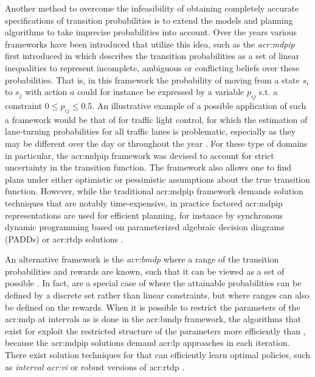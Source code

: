 Another method to overcome the infeasibility of obtaining completely accurate specifications of transition probabilities is to extend the models and planning algorithms to take imprecise probabilities into account.
Over the years various frameworks have been introduced that utilize this idea, such as the \textit{\acrfull{acr:mdpip}} first introduced in \cite{satia1973markovian} which describes the transition probabilities as a set of linear inequalities to represent incomplete, ambiguous or conflicting beliefs over these probabilities.
That is, in this framework the probability of moving from a state $s_i$ to $s_j$ with action $a$ could for instance be expressed by a variable $p_{ij}$ s.t. a constraint $0 \leq p_{ij} \leq 0.5$.
An illustrative example of a possible application of such a framework would be that of  for traffic light control, for which the estimation of lane-turning probabilities for all traffic lanes is problematic, especially as they may be different over the day or throughout the year \cite{delgado2011efficient}.
For these type of domains in particular, the \acrshort{acr:mdpip} framework was devised to account for strict uncertainty in the transition function.
The framework also allows one to find plans under either optimistic or pessimistic assumptions about the true transition function.
However, while the traditional \acrshort{acr:mdpip} framework demands solution techniques that are notably time-expensive, in practice factored \acrshort{acr:mdpip} representations are used for efficient planning, for instance by synchronous dynamic programming based on parameterized algebraic decision diagrams (PADDs) \cite{delgado2011efficient} or \acrshort{acr:rtdp} solutions \cite{delgado2016real}.

An alternative framework is the \textit{\acrfull{acr:bmdp}} where a range of the transition probabilities and rewards are known, such that it can be viewed as a set of possible .
In fact,  are a special case of  where the attainable probabilities can be defined by a discrete set rather than linear constraints, but where ranges can also be defined on the rewards.
When it is possible to restrict the parameters of the \acrshort{acr:mdp} at intervals as is done in the \acrshort{acr:bmdp} framework, the algorithms that exist for  exploit the restricted structure of the parameters more efficiently than , because the \acrshort{acr:mdpip} solutions demand \acrshort{acr:lp} approaches in each iteration.
There exist solution techniques for  that can efficiently learn optimal policies, such as \textit{interval \acrshort{acr:vi}} \cite{givan2000bounded} or robust versions of \acrshort{acr:rtdp} \cite{buffet2005robust}.


